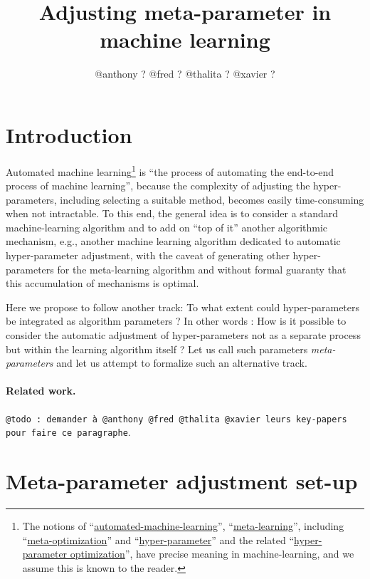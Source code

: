 \documentclass{article}
\begin{document}
\iffalse

\title{Adjusting meta-parameter in machine learning}
\author{@anthony ? @fred ? @thalita ? @xavier ?}

\section{Introduction}

Automated machine learning\footnote{The notions of ``\href{https://en.wikipedia.org/wiki/Automated\_machine\_learning}{automated-machine-learning}'', 
``\href{https://en.wikipedia.org/wiki/Meta_learning_(computer_science)}{meta-learning}'', including ``\href{https://en.wikipedia.org/wiki/Meta-optimization}{meta-optimization}'' and ``\href{https://en.wikipedia.org/wiki/Hyperparameter_(machine_learning)}{hyper-parameter}'' and the related ``\href{http://neupy.com/2016/12/17/hyperparameter\_optimization\_for\_neural\_networks.html}{hyper-parameter optimization}'', have precise meaning in machine-learning, and we assume this is known to the reader.} is ``the process of automating the end-to-end process of machine learning'', because the complexity of adjusting the hyper-parameters, including selecting a suitable method, becomes easily time-consuming when not intractable. To this end, the general idea is to consider a standard machine-learning algorithm and to add on ``top of it'' another algorithmic mechanism, e.g., another machine learning algorithm dedicated to automatic hyper-parameter adjustment, with the caveat of generating other hyper-parameters for the meta-learning algorithm and without formal guaranty that this accumulation of mechanisms is optimal.

Here we propose to follow another track: To what extent could hyper-parameters be integrated as algorithm parameters ? In other words : How is it possible to consider the automatic adjustment of hyper-parameters not as a separate process but within the learning algorithm itself ? Let us call such parameters {\em meta-parameters} and let us attempt to formalize such an alternative track.

\paragraph{Related work.} {\tt @todo : demander à  @anthony @fred @thalita @xavier leurs key-papers pour faire ce paragraphe}.

\section{Meta-parameter adjustment set-up}
\end{document}
